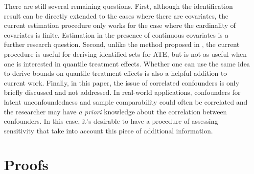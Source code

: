 \documentclass[12pt]{article}
\begin{document}
  There are still several remaining questions. 
  First, although the identification result can be directly extended to the cases where there are covariates, the current estimation procedure only works for the case where the cardinality of covariates is finite. Estimation in the presence of continuous covariates is a further research question. Second, unlike the method proposed in \textcite{masten2018identification}, 
  the current procedure is useful for deriving identified sets for ATE, but is not as useful when one is interested in quantile treatment effects. Whether one can use the same idea to derive bounds on quantile treatment effects is also a helpful addition to current work. Finally, in this paper, the issue of correlated confounders is only briefly discussed and not addressed. In real-world applications, confounders for latent unconfoundedness and sample comparability could often be correlated and the researcher may have \textit{a priori} knowledge about the correlation between confounders. In this case, it's desirable to have a procedure of assessing sensitivity that take into account this piece of additional information. 
    
	\medskip
	
	\pagebreak
	\nocite{*}
	\printbibliography
	
	\pagebreak
	\appendix
	\section{Proofs}

	
	\duality*
	
\end{document}
